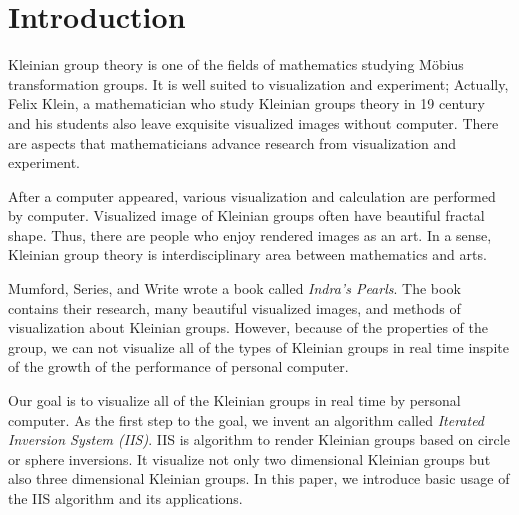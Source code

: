 

\section{Introduction}

Kleinian group theory is one of the fields of mathematics studying 
M\"obius transformation groups.
It is well suited to visualization and experiment;
Actually, Felix Klein, a mathematician who study Kleinian groups theory
in 19 century and his students also leave exquisite visualized images
without computer.
There are aspects that mathematicians advance research from
visualization and experiment.

After a computer appeared, various visualization and calculation are
performed by computer.
Visualized image of Kleinian groups often have beautiful fractal shape.
Thus, there are people who enjoy rendered images as an art.
In a sense, Kleinian group theory is interdisciplinary area between
mathematics and arts.

Mumford, Series, and Write wrote a book called
\textit{Indra's Pearls}\cite{MumfordSeriesWright200204}.
The book contains their research, many beautiful visualized images, and
methods of visualization about Kleinian groups.
However, because of the properties of the group, we can not
visualize all of the types of Kleinian groups in real time
inspite of the growth of the performance of personal computer.

Our goal is to visualize all of the Kleinian groups in real time by
personal computer.
As the first step to the goal, we invent an algorithm called
\textit{Iterated Inversion System (IIS)}.
IIS is algorithm to render Kleinian groups based on circle or sphere
inversions.
It visualize not only two dimensional Kleinian groups but also three
dimensional Kleinian groups.
In this paper, we introduce basic usage of the IIS algorithm and its
applications.



